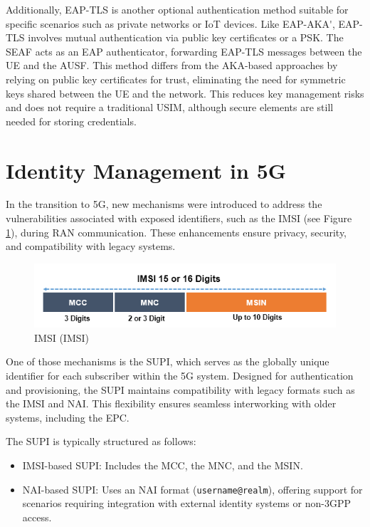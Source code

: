 Additionally, \ac{EAP-TLS} is another optional authentication method suitable for specific scenarios such as private networks or \ac{IoT} devices. Like \ac{EAP-AKA'}, \ac{EAP-TLS} involves mutual authentication via public key certificates or a \ac{PSK}. The \ac{SEAF} acts as an \ac{EAP} authenticator, forwarding \ac{EAP-TLS} messages between the \ac{UE} and the \ac{AUSF}. This method differs from the \ac{AKA}-based approaches by relying on public key certificates for trust, eliminating the need for symmetric keys shared between the \ac{UE} and the network. This reduces key management risks and does not require a traditional \ac{USIM}, although secure elements are still needed for storing credentials.

\section{Identity Management in \acs{5G}} %

In the transition to \ac{5G}, new mechanisms were introduced to address the vulnerabilities associated with exposed identifiers, such as the \ac{IMSI} (see Figure \ref{fig:International Mobile Subscriber Identity (IMSI)}), during \ac{RAN} communication. These enhancements ensure privacy, security, and compatibility with legacy systems.

\begin{figure}
    \centering
    \includegraphics[width=0.75\linewidth]{figs/International Mobile Subscriber Identity (IMSI).png}
    \caption{\acl{IMSI} (\ac{IMSI})}
    \label{fig:International Mobile Subscriber Identity (IMSI)}
\end{figure}

One of those mechanisms is the \ac{SUPI}, which serves as the globally unique identifier for each subscriber within the \ac{5G} system. Designed for authentication and provisioning, the \ac{SUPI} maintains compatibility with legacy formats such as the \ac{IMSI} and \ac{NAI}. This flexibility ensures seamless interworking with older systems, including the \ac{EPC}.

The \ac{SUPI} is typically structured as follows:
\begin{itemize}
    \item {
          \ac{IMSI}-based \ac{SUPI}: Includes the \ac{MCC}, the \ac{MNC}, and the \ac{MSIN}.
          }
    \item {
          \ac{NAI}-based \ac{SUPI}: Uses an \ac{NAI} format (\texttt{username@realm}), offering support for scenarios requiring integration with external identity systems or non-\ac{3GPP} access.
          }
\end{itemize}

